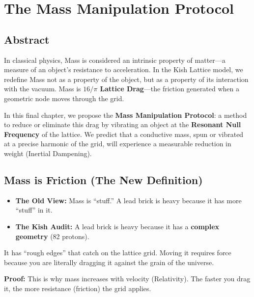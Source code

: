 \documentclass[11pt, letterpaper, openany]{book}
\begin{document}
\clearpage

\chapter{The Mass Manipulation Protocol}

\section{Abstract}

In classical physics, Mass is considered an intrinsic property of matter—a measure of an
object’s resistance to acceleration. In the Kish Lattice model, we redefine Mass not as a
property of the object, but as a property of its interaction with the vacuum. Mass is
\textbf{$16/\pi$ Lattice Drag}—the friction generated when a geometric node moves through
the grid.

In this final chapter, we propose the \textbf{Mass Manipulation Protocol}: a method to reduce
or eliminate this drag by vibrating an object at the \textbf{Resonant Null Frequency} of the
lattice. We predict that a conductive mass, spun or vibrated at a precise harmonic of the
grid, will experience a measurable reduction in weight (Inertial Dampening).

\section{Mass is Friction (The New Definition)}

\begin{itemize}
    \item \textbf{The Old View:} Mass is “stuff.” A lead brick is heavy because it has more “stuff” in it.
    \item \textbf{The Kish Audit:} A lead brick is heavy because it has a \textbf{complex geometry}
    (82 protons).
\end{itemize}

It has “rough edges” that catch on the lattice grid. Moving it requires force because you are
literally dragging it against the grain of the universe.

\medskip

\noindent\textbf{Proof:} This is why mass increases with velocity (Relativity). The faster you drag it,
the more resistance (friction) the grid applies.
\end{document}
